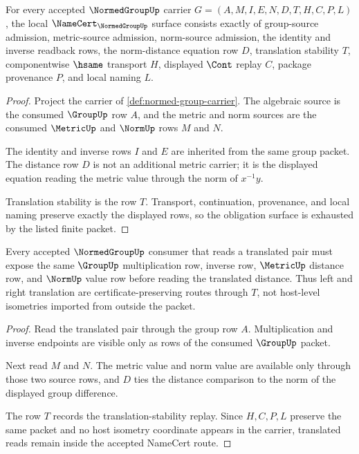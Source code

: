 \begin{theorem}
\label{thm:normed-group-namecert-obligations}
For every accepted $\NormedGroupUp$ carrier $G=(A,M,I,E,N,D,T,H,C,P,L)$, the local $\NameCert_{\NormedGroupUp}$ surface consists exactly of group-source admission, metric-source admission, norm-source admission, the identity and inverse readback rows, the norm-distance equation row $D$, translation stability $T$, componentwise $\hsame$ transport $H$, displayed $\Cont$ replay $C$, package provenance $P$, and local naming $L$.
\end{theorem}
\begin{proof}
Project the carrier of \autoref{def:normed-group-carrier}. The algebraic source is the consumed $\GroupUp$ row $A$, and the metric and norm sources are the consumed $\MetricUp$ and $\NormUp$ rows $M$ and $N$.

The identity and inverse rows $I$ and $E$ are inherited from the same group packet. The distance row $D$ is not an additional metric carrier; it is the displayed equation reading the metric value through the norm of $x^{-1}y$.

Translation stability is the row $T$. Transport, continuation, provenance, and local naming preserve exactly the displayed rows, so the obligation surface is exhausted by the listed finite packet.
\end{proof}

\begin{theorem}
\label{thm:normed-group-metric-translation-stability}
Every accepted $\NormedGroupUp$ consumer that reads a translated pair must expose the same $\GroupUp$ multiplication row, inverse row, $\MetricUp$ distance row, and $\NormUp$ value row before reading the translated distance. Thus left and right translation are certificate-preserving routes through $T$, not host-level isometries imported from outside the packet.
\end{theorem}
\begin{proof}
Read the translated pair through the group row $A$. Multiplication and inverse endpoints are visible only as rows of the consumed $\GroupUp$ packet.

Next read $M$ and $N$. The metric value and norm value are available only through those two source rows, and $D$ ties the distance comparison to the norm of the displayed group difference.

The row $T$ records the translation-stability replay. Since $H,C,P,L$ preserve the same packet and no host isometry coordinate appears in the carrier, translated reads remain inside the accepted NameCert route.
\end{proof}


